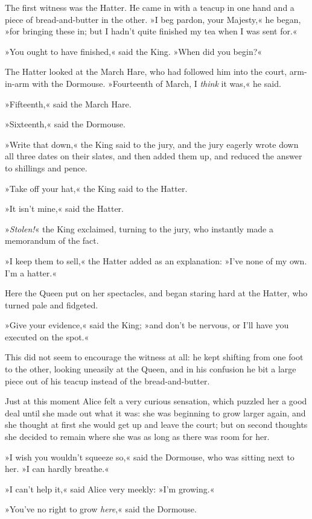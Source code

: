 The first witness was the Hatter. He came in with a teacup in one hand and a piece of bread-and-butter in the other. »I beg pardon, your Majesty,« he began, »for bringing these in; but I hadn't quite finished my tea when I was sent for.«

»You ought to have finished,« said the King. »When did you begin?«

The Hatter looked at the March Hare, who had followed him into the court, arm-in-arm with the Dormouse. »Fourteenth of March, I \textit{think} it was,« he said.

»Fifteenth,« said the March Hare.

»Sixteenth,« said the Dormouse.

»Write that down,« the King said to the jury, and the jury eagerly wrote down all three dates on their slates, and then added them up, and reduced the answer to shillings and pence.

»Take off your hat,« the King said to the Hatter.

»It isn't mine,« said the Hatter.

»\textit{Stolen!}« the King exclaimed, turning to the jury, who instantly made a memorandum of the fact.

»I keep them to sell,« the Hatter added as an explanation: »I've none of my own. I'm a hatter.«

Here the Queen put on her spectacles, and began staring hard at the Hatter, who turned pale and fidgeted.

»Give your evidence,« said the King; »and don't be nervous, or I'll have you executed on the spot.«

This did not seem to encourage the witness at all: he kept shifting from one foot to the other, looking uneasily at the Queen, and in his confusion he bit a large piece out of his teacup instead of the bread-and-butter.

Just at this moment Alice felt a very curious sensation, which puzzled her a good deal until she made out what it was: she was beginning to grow larger again, and she thought at first she would get up and leave the court; but on second thoughts she decided to remain where she was as long as there was room for her.

»I wish you wouldn't squeeze so,« said the Dormouse, who was sitting next to her. »I can hardly breathe.«

»I can't help it,« said Alice very meekly: »I'm growing.«

»You've no right to grow \textit{here},« said the Dormouse.

